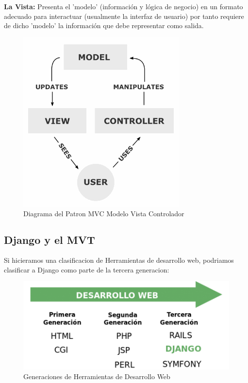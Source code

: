 {\bfseries La Vista: } Presenta el 'modelo' (información y lógica de negocio)
 en un formato adecuado para interactuar (usualmente la interfaz de usuario)
 por tanto requiere de dicho 'modelo' la información que debe representar como
 salida.

\begin{figure}[h]
    \centering
    \includegraphics[scale=0.7]{resourse/MVC-Process.png}
    \caption{Diagrama del Patron MVC Modelo Vista Controlador}
    \label{fig:03}
\end{figure}    


\subsection{Django y el MVT}

Si hicieramos una clasificacion de Herramientas de desarrollo web, podriamos
clasificar a Django como parte de la tercera generacion:


\begin{figure}[h]
    \centering
    \includegraphics[scale=0.7]{resourse/desarrolloweb.png}
    \caption{Generaciones de Herramientas de Desarrollo Web}
    \label{fig:02}
\end{figure}   

